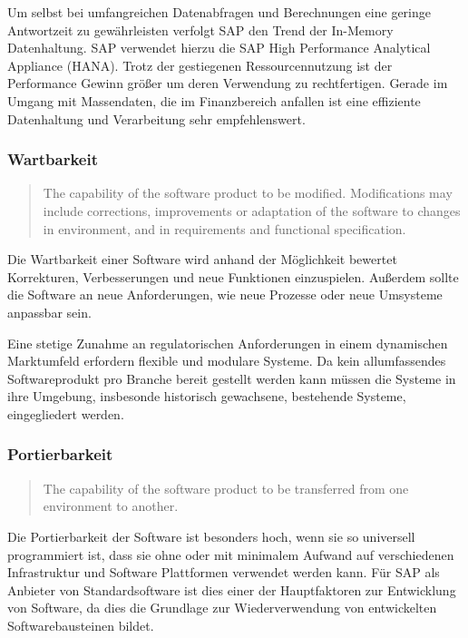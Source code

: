             Um selbst bei umfangreichen Datenabfragen und Berechnungen eine geringe Antwortzeit zu gewährleisten verfolgt SAP den Trend der In-Memory Datenhaltung. SAP verwendet hierzu die SAP High Performance Analytical Appliance (HANA). Trotz der gestiegenen Ressourcennutzung ist der Performance Gewinn größer um deren Verwendung zu rechtfertigen. Gerade im Umgang mit Massendaten, die im Finanzbereich anfallen ist eine effiziente Datenhaltung und Verarbeitung sehr empfehlenswert.

        \subsubsection{Wartbarkeit}

            \begin{quote}
              The capability of the software product to be modified. Modifications may include corrections, improvements or adaptation of the software to changes in environment, and in requirements and functional specification.
            \end{quote}

            Die Wartbarkeit einer Software wird anhand der Möglichkeit bewertet Korrekturen, Verbesserungen und neue Funktionen einzuspielen. Außerdem sollte die Software an neue Anforderungen, wie neue Prozesse oder neue Umsysteme anpassbar sein.

            Eine stetige Zunahme an regulatorischen Anforderungen in einem dynamischen Marktumfeld erfordern flexible und modulare Systeme. Da kein allumfassendes Softwareprodukt pro Branche bereit gestellt werden kann müssen die Systeme in ihre Umgebung, insbesonde historisch gewachsene, bestehende Systeme, eingegliedert werden.

        \subsubsection{Portierbarkeit}

            \begin{quote}
              The capability of the software product to be transferred from one environment to another.
            \end{quote}

            Die Portierbarkeit der Software ist besonders hoch, wenn sie so universell programmiert ist, dass sie ohne oder mit minimalem Aufwand auf verschiedenen Infrastruktur und Software Plattformen verwendet werden kann. Für SAP als Anbieter von Standardsoftware ist dies einer der Hauptfaktoren zur Entwicklung von Software, da dies die Grundlage zur Wiederverwendung von entwickelten Softwarebausteinen bildet.

